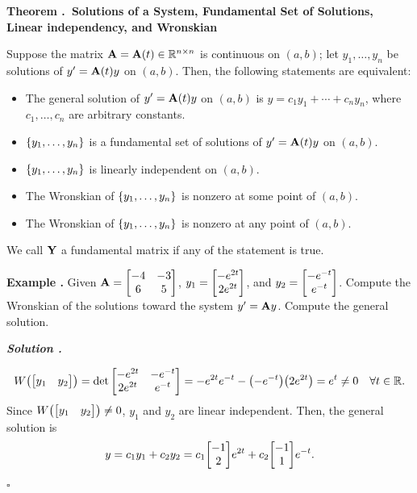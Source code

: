 \documentclass[12pt, a4paper]{article}
\newcounter{index}[subsection]
\newenvironment*{eg}{\begin{framed}\par\noindent\textbf{Example \thesubsection.\stepcounter{index}\theindex}}{\par\end{framed}}
\newenvironment*{thm}[1]{\begin{tcolorbox}\par\noindent\textbf{Theorem \thesubsection.\stepcounter{index}\theindex\ #1} \par}{\par\end{tcolorbox}}
\newcounter{nprf}[subsection]
\newenvironment*{sol}{\par\indent\textbf{\textit{Solution \stepcounter{nprf}\thenprf.}}\par}{\hfill{$\square$}\par}
\def\R{{\mathbb{R}}}
\def\A{\vb A}
\def\Y{\vb Y}
\begin{document}
\begin{thm}{Solutions of a System, Fundamental Set of Solutions, Linear independency, and Wronskian}
	Suppose the matrix $\A=\A(t)\in\R^{n\times n}$ is continuous on $(a,b)$; let $y_1,\dots,y_n$ be solutions of $y'=\A(t)y$ on $(a,b)$. Then, the following statements are equivalent: 
	\begin{itemize}
		\item The general solution of $y'=\A(t)y$ on $(a,b)$ is $y=c_1y_1+\cdots+c_ny_n$, where $c_1,\dots,c_n$ are arbitrary constants.
		\item $\qty{y_1,\dots,y_n}$ is a fundamental set of solutions of $y'=\A(t)y$ on $(a,b)$.
		\item $\qty{y_1,\dots,y_n}$ is linearly independent on $(a,b)$.
		\item The Wronskian of $\qty{y_1,\dots,y_n}$ is nonzero at some point of $(a,b)$.
		\item The Wronskian of $\qty{y_1,\dots,y_n}$ is nonzero at any point of $(a,b)$.
	\end{itemize}
	We call $\Y$ a fundamental matrix if any of the statement is true. 
\end{thm}
\begin{eg}
	Given $\A=\mqty[-4&-3\\6&5]$, $y_1=\mqty[-e^{2t}\\2e^{2t}]$, and $y_2=\mqty[-e^{-t}\\e^{-t}]$. Compute the Wronskian of the solutions toward the system $y'=\A y$. Compute the general solution.
	\begin{sol}
		\[W\qty(\mqty[y_1&y_2])=\det\mqty[-e^{2t}&-e^{-t}\\2e^{2t}&e^{-t}]=-e^{2t}e^{-t}-\qty(-e^{-t})\qty(2e^{2t})=e^t\neq0\quad\forall t\in\R.\] Since $W\qty(\mqty[y_1&y_2])\neq0$, $y_1$ and $y_2$ are linear independent. Then, the general solution is \[y=c_1y_1+c_2y_2=c_1\mqty[-1\\2]e^{2t}+c_2\mqty[-1\\1]e^{-t}.\] 
	\end{sol}
\end{eg}
\end{document}

